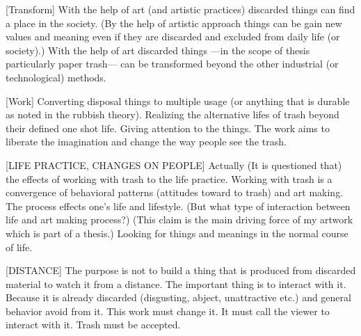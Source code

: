 [Transform] With the help of art (and artistic practices) discarded things can find a place in the society. (By the help of artistic approach things can be gain new values and meaning even if they are discarded and excluded from daily life (or society).) With the help of art discarded things ---in the scope of thesis particularly paper trash--- can be transformed beyond the other industrial (or technological) methods. 

[Work] Converting disposal things to multiple usage (or anything that is durable as noted in the rubbish theory). Realizing the alternative lifes of trash beyond their defined one shot life. Giving attention to the things.  The work aims to liberate the imagination and change the way people see the trash.

[LIFE PRACTICE, CHANGES ON PEOPLE] Actually (It is questioned that) the effects of working with trash to the life practice. Working with trash is a convergence of behavioral patterns (attitudes toward to trash) and art making. The process effects one's life and lifestyle. (But what type of interaction between life and art making process?) (This claim is the main driving force of my artwork which is part of a thesis.) Looking for things and meanings in the normal course of life.

[DISTANCE] The purpose is not to build a thing that is produced from discarded material to watch it from a distance. The important thing is to interact with it. Because it is already discarded (disgusting, abject, unattractive etc.) and general behavior avoid from it. This work must change it. It must call the viewer to interact with it. Trash must be accepted.



